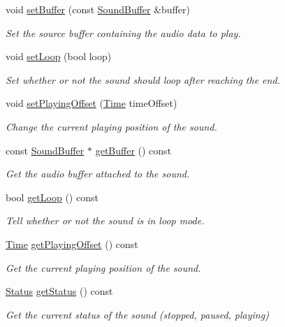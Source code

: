 \begin{DoxyCompactItemize}
void \hyperlink{classsf_1_1_sound_a8b395e9713d0efa48a18628c8ec1972e}{set\+Buffer} (const \hyperlink{classsf_1_1_sound_buffer}{Sound\+Buffer} \&buffer)
\begin{DoxyCompactList}\small\item\em Set the source buffer containing the audio data to play. \end{DoxyCompactList}\item 
void \hyperlink{classsf_1_1_sound_af23ab4f78f975bbabac031102321612b}{set\+Loop} (bool loop)
\begin{DoxyCompactList}\small\item\em Set whether or not the sound should loop after reaching the end. \end{DoxyCompactList}\item 
void \hyperlink{classsf_1_1_sound_ab905677846558042022dd6ab15cddff0}{set\+Playing\+Offset} (\hyperlink{classsf_1_1_time}{Time} time\+Offset)
\begin{DoxyCompactList}\small\item\em Change the current playing position of the sound. \end{DoxyCompactList}\item 
const \hyperlink{classsf_1_1_sound_buffer}{Sound\+Buffer} $\ast$ \hyperlink{classsf_1_1_sound_ab873727ae652c96b5a9437d7f8d8a44d}{get\+Buffer} () const
\begin{DoxyCompactList}\small\item\em Get the audio buffer attached to the sound. \end{DoxyCompactList}\item 
bool \hyperlink{classsf_1_1_sound_a054da07266ce8f39229495146e3041eb}{get\+Loop} () const
\begin{DoxyCompactList}\small\item\em Tell whether or not the sound is in loop mode. \end{DoxyCompactList}\item 
\hyperlink{classsf_1_1_time}{Time} \hyperlink{classsf_1_1_sound_a559bc3aea581107bcb380fdbe523aa08}{get\+Playing\+Offset} () const
\begin{DoxyCompactList}\small\item\em Get the current playing position of the sound. \end{DoxyCompactList}\item 
\hyperlink{classsf_1_1_sound_source_ac43af72c98c077500b239bc75b812f03}{Status} \hyperlink{classsf_1_1_sound_a406fc363594a7718a53ebef49a870f51}{get\+Status} () const
\begin{DoxyCompactList}\small\item\em Get the current status of the sound (stopped, paused, playing) \end{DoxyCompactList}\item 

\end{DoxyCompactItemize}
